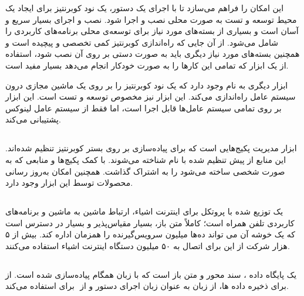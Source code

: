 این امکان را فراهم می‌سازد تا با اجرای یک دستور، یک نود کوبرنتیز برای ایجاد یک محیط توسعه و تست به صورت محلی نصب و اجرا شود. نصب و اجرای  بسیار سریع و آسان است و بسیاری از بسته‌های مورد نیاز برای توسعه‌ی محلی برنامه‌های کاربردی را شامل می‌شود. از آن جایی که راه‌اندازی کوبرنتیز کمی تخصصی و پیچیده است و همچنین بسته‌های مورد نیاز دیگری باید به صورت دستی بر روی آن نصب شود، استفاده از یک ابزار که تمامی این کارها را به صورت خودکار انجام می‌دهد بسیار مفید است.
\cite{microk8s}

ابزار دیگری به نام  وجود دارد که یک نود کوبرنتیز را بر روی یک ماشین مجازی درون سیستم عامل راه‌اندازی می‌کند. این ابزار نیز مخصوص توسعه و تست است. این ابزار بر روی تمامی سیستم عامل‌ها قابل اجرا است، اما  فقط از سیستم عامل لینوکس پشتیبانی می‌کند.
\cite{minikube}

\subsection{}

ابزار مدیریت پکیج‌هایی است که برای پیاده‌سازی بر روی بستر کوبرنتیز تنظیم شده‌اند. این منابع از پیش تنظیم شده با نام  شناخته می‌شوند. با کمک  پکیچ‌ها و منابعی که به صورت شخصی ساخته می‌شود را به اشتراک گذاشت. همچنین امکان به‌روز رسانی محصولات توسط این ابزار وجود دارد. 	
\cite{helm}

\subsection{}

 یک  توزیع شده با پروتکل  برای اینترنت اشیاء، ارتباط ماشین به ماشین و برنامه‌های کاربردی تلفن همراه است؛ کاملاً متن باز، بسیار مقیاس‌پذیر و بسیار در دسترس است که یک خوشه آن می تواند ده‌ها میلیون سرویس‌گیرنده را همزمان اداره کند. بیش از ۵ هزار شرکت از این  برای اتصال به ۵۰ میلیون دستگاه اینترنت اشیاء استفاده می‌کنند.
\cite{emqx}

\subsection{}

 یک پایگاه داده ، سند محور و متن باز است که با زبان همگام  پیاده‌سازی شده است. از  برای ذخیره داده ها، از زبان  به عنوان زبان اجرای دستور و از ‌ برای  استفاده می‌کند.

